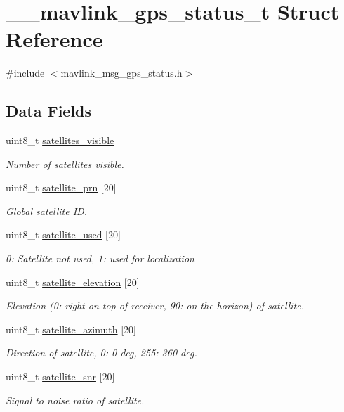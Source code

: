 \hypertarget{struct____mavlink__gps__status__t}{\section{\+\_\+\+\_\+mavlink\+\_\+gps\+\_\+status\+\_\+t Struct Reference}
\label{struct____mavlink__gps__status__t}
}


{\ttfamily \#include $<$mavlink\+\_\+msg\+\_\+gps\+\_\+status.\+h$>$}

\subsection*{Data Fields}
\begin{DoxyCompactItemize}
\item 
uint8\+\_\+t \hyperlink{struct____mavlink__gps__status__t_aaf907a0b7ca1bf692b59b3c07269a72d}{satellites\+\_\+visible}
\begin{DoxyCompactList}\small\item\em Number of satellites visible. \end{DoxyCompactList}\item 
uint8\+\_\+t \hyperlink{struct____mavlink__gps__status__t_a1a615b66354df8f0bfb0c269251b1f21}{satellite\+\_\+prn} \mbox{[}20\mbox{]}
\begin{DoxyCompactList}\small\item\em Global satellite I\+D. \end{DoxyCompactList}\item 
uint8\+\_\+t \hyperlink{struct____mavlink__gps__status__t_a84d55d0f78f60eecf76ee27767a80695}{satellite\+\_\+used} \mbox{[}20\mbox{]}
\begin{DoxyCompactList}\small\item\em 0\+: Satellite not used, 1\+: used for localization \end{DoxyCompactList}\item 
uint8\+\_\+t \hyperlink{struct____mavlink__gps__status__t_aa0df643ba0353ad8affab5768675b9ea}{satellite\+\_\+elevation} \mbox{[}20\mbox{]}
\begin{DoxyCompactList}\small\item\em Elevation (0\+: right on top of receiver, 90\+: on the horizon) of satellite. \end{DoxyCompactList}\item 
uint8\+\_\+t \hyperlink{struct____mavlink__gps__status__t_a956bcb507823363c6dd78318ecbd0ff4}{satellite\+\_\+azimuth} \mbox{[}20\mbox{]}
\begin{DoxyCompactList}\small\item\em Direction of satellite, 0\+: 0 deg, 255\+: 360 deg. \end{DoxyCompactList}\item 
uint8\+\_\+t \hyperlink{struct____mavlink__gps__status__t_ab2fd8b1564a9ff56248448f6744f6f0e}{satellite\+\_\+snr} \mbox{[}20\mbox{]}
\begin{DoxyCompactList}\small\item\em Signal to noise ratio of satellite. \end{DoxyCompactList}\end{DoxyCompactItemize}


